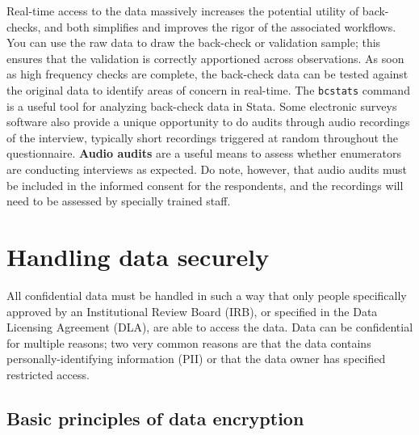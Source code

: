Real-time access to the data massively increases the potential utility of back-checks,
and both simplifies and improves the rigor of the associated workflows.
You can use the raw data to draw the back-check or validation sample;
this ensures that the validation is correctly apportioned across observations.
As soon as high frequency checks are complete,
the back-check data can be tested against
the original data to identify areas of concern in real-time.
The \texttt{bcstats} command is a useful tool for analyzing back-check data in Stata.
Some electronic surveys software also provide a unique opportunity
to do audits through audio recordings of the interview,
typically short recordings triggered at random throughout the questionnaire.
\textbf{Audio audits}
are a useful means to assess whether enumerators are conducting interviews as expected.
Do note, however, that audio audits must be included in the informed consent for the respondents,
and the recordings will need to be assessed by specially trained staff.



\section{Handling data securely}

All confidential data must be handled in such a way that only people specifically
approved by an Institutional Review Board (IRB),
or specified in the Data Licensing Agreement (DLA),
are able to access the data.
Data can be confidential for multiple reasons;
two very common reasons are that the data contains
personally-identifying information (PII)
or that the data owner has specified restricted access.

\subsection{Basic principles of data encryption}

